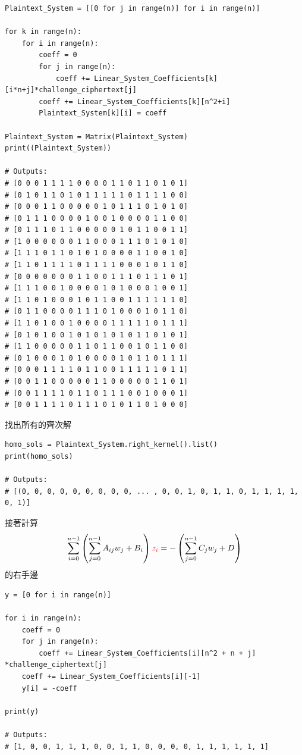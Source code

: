 \documentclass[
]{article}
\begin{document}
\begin{verbatim}
Plaintext_System = [[0 for j in range(n)] for i in range(n)]

for k in range(n):
    for i in range(n):
        coeff = 0
        for j in range(n):
            coeff += Linear_System_Coefficients[k][i*n+j]*challenge_ciphertext[j]
        coeff += Linear_System_Coefficients[k][n^2+i]
        Plaintext_System[k][i] = coeff

Plaintext_System = Matrix(Plaintext_System)
print((Plaintext_System))

# Outputs:
# [0 0 0 1 1 1 1 0 0 0 0 1 1 0 1 1 0 1 0 1]
# [0 1 0 1 1 0 1 0 1 1 1 1 1 0 1 1 1 1 0 0]
# [0 0 0 1 1 0 0 0 0 0 1 0 1 1 1 0 1 0 1 0]
# [0 1 1 1 0 0 0 0 1 0 0 1 0 0 0 0 1 1 0 0]
# [0 1 1 1 0 1 1 0 0 0 0 0 1 0 1 1 0 0 1 1]
# [1 0 0 0 0 0 0 1 1 0 0 0 1 1 1 0 1 0 1 0]
# [1 1 1 0 1 1 0 1 0 1 0 0 0 0 1 1 0 0 1 0]
# [1 1 0 1 1 1 1 0 1 1 1 1 0 0 0 1 0 1 1 0]
# [0 0 0 0 0 0 0 1 1 0 0 1 1 1 0 1 1 1 0 1]
# [1 1 1 0 0 1 0 0 0 0 1 0 1 0 0 0 1 0 0 1]
# [1 1 0 1 0 0 0 1 0 1 1 0 0 1 1 1 1 1 1 0]
# [0 1 1 0 0 0 0 1 1 1 0 1 0 0 0 1 0 1 1 0]
# [1 1 0 1 0 0 1 0 0 0 0 1 1 1 1 1 0 1 1 1]
# [0 1 0 1 0 0 1 0 1 0 1 0 1 0 1 1 0 1 0 1]
# [1 1 0 0 0 0 0 1 1 0 1 1 0 0 1 0 1 1 0 0]
# [0 1 0 0 0 1 0 1 0 0 0 0 1 0 1 1 0 1 1 1]
# [0 0 0 1 1 1 1 0 1 1 0 0 1 1 1 1 1 0 1 1]
# [0 0 1 1 0 0 0 0 0 1 1 0 0 0 0 0 1 1 0 1]
# [0 0 1 1 1 1 0 1 1 0 1 1 1 0 0 1 0 0 0 1]
# [0 0 1 1 1 1 0 1 1 1 0 1 0 1 1 0 1 0 0 0]
\end{verbatim}

找出所有的齊次解

\begin{verbatim}
homo_sols = Plaintext_System.right_kernel().list()
print(homo_sols)

# Outputs:
# [(0, 0, 0, 0, 0, 0, 0, 0, 0, ... , 0, 0, 1, 0, 1, 1, 0, 1, 1, 1, 1, 0, 1)]
\end{verbatim}

接著計算 \[
\sum_{i=0}^{n-1} \left( \sum_{j=0}^{n-1} A_{ij}w_{j} +B_{i}\right){\color{red}z_{i}} =- 
\left( \sum_{j=0}^{n-1} C_{j}w_{j} + D  \right)
\] 的右手邊

\begin{verbatim}
y = [0 for i in range(n)]

for i in range(n):
    coeff = 0
    for j in range(n):
        coeff += Linear_System_Coefficients[i][n^2 + n + j] *challenge_ciphertext[j]
    coeff += Linear_System_Coefficients[i][-1]
    y[i] = -coeff

print(y)

# Outputs:
# [1, 0, 0, 1, 1, 1, 0, 0, 1, 1, 0, 0, 0, 0, 1, 1, 1, 1, 1, 1]
\end{verbatim}
\end{document}
